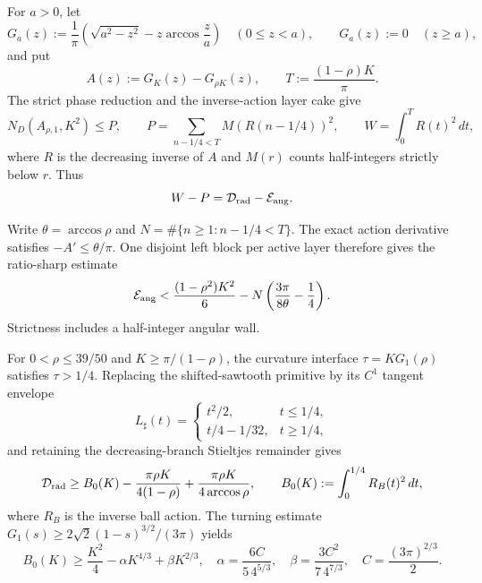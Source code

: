 For $a>0$, let
\[
 G_a(z):=\frac1\pi\left(\sqrt{a^2-z^2}
 -z\arccos\frac za\right)\quad(0\leq z<a),
 \qquad G_a(z):=0\quad(z\geq a),
\]
and put
\[
 A(z):=G_K(z)-G_{\rho K}(z),
 \qquad T:=\frac{(1-\rho)K}{\pi}.
\]
The strict phase reduction and the inverse-action layer cake give
\begin{equation}
 N_D(A_{\rho,1},K^2)\leq P,\qquad
 P=\sum_{n-1/4<T}M(R(n-1/4))^2,\qquad
 W=\int_0^TR(t)^2\,dt,
 \label{rs-summary:eq:layer-cake}
\end{equation}
where $R$ is the decreasing inverse of $A$ and $M(r)$ counts
half-integers strictly below $r$.  Thus
\[
 W-P=\mathcal D_{\rm rad}-\mathcal E_{\rm ang}.
\]

Write $\theta=\arccos\rho$ and
$N=\#\{n\geq1:n-1/4<T\}$.  The exact action derivative satisfies
$-A'\leq\theta/\pi$.  One disjoint left block per active layer therefore
gives the ratio-sharp estimate
\begin{equation}
 \mathcal E_{\rm ang}
 <\frac{(1-\rho^2)K^2}{6}
 -N\left(\frac{3\pi}{8\theta}-\frac14\right).
 \label{rs-summary:eq:angular}
\end{equation}
Strictness includes a half-integer angular wall.

For $0<\rho\leq39/50$ and $K\geq\pi/(1-\rho)$, the curvature interface
$\tau=KG_1(\rho)$ satisfies $\tau>1/4$.  Replacing the shifted-sawtooth
primitive by its $C^1$ tangent envelope
\[
 L_\sharp(t)=
 \begin{cases}t^2/2,&t\leq1/4,\\t/4-1/32,&t\geq1/4,\end{cases}
\]
and retaining the decreasing-branch Stieltjes remainder gives
\begin{equation}
 \mathcal D_{\rm rad}\geq
 B_0(K)-\frac{\pi\rho K}{4(1-\rho)}
 +\frac{\pi\rho K}{4\arccos\rho},
 \qquad
 B_0(K):=\int_0^{1/4}R_B(t)^2\,dt,
 \label{rs-summary:eq:radial}
\end{equation}
where $R_B$ is the inverse ball action.  The turning estimate
$G_1(s)\geq2\sqrt2(1-s)^{3/2}/(3\pi)$ yields
\begin{equation}
 B_0(K)\geq\frac{K^2}{4}-\alpha K^{4/3}+\beta K^{2/3},
 \quad
 \alpha=\frac{6C}{5\,4^{5/3}},\quad
 \beta=\frac{3C^2}{7\,4^{7/3}},\quad
 C=\frac{(3\pi)^{2/3}}2.
 \label{rs-summary:eq:ball}
\end{equation}

